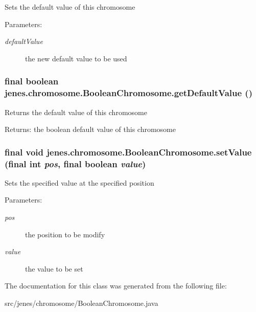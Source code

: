 Sets the default value of this chromosome 

\begin{Desc}
\item[Parameters:]
\begin{description}
\item[{\em defaultValue}]the new default value to be used \end{description}
\end{Desc}
\hypertarget{classjenes_1_1chromosome_1_1_boolean_chromosome_9b75f626b2b5fbc90215a53ac91d24a7}{
\subsubsection[getDefaultValue]{\setlength{\rightskip}{0pt plus 5cm}final boolean jenes.chromosome.BooleanChromosome.getDefaultValue ()}}
\label{classjenes_1_1chromosome_1_1_boolean_chromosome_9b75f626b2b5fbc90215a53ac91d24a7}


Returns the default value of this chromosome 

\begin{Desc}
\item[Returns:]the boolean default value of this chromosome \end{Desc}
\hypertarget{classjenes_1_1chromosome_1_1_boolean_chromosome_b37e05ed7a30e43b740f0c2d9c548e88}{
\subsubsection[setValue]{\setlength{\rightskip}{0pt plus 5cm}final void jenes.chromosome.BooleanChromosome.setValue (final int {\em pos}, \/  final boolean {\em value})}}
\label{classjenes_1_1chromosome_1_1_boolean_chromosome_b37e05ed7a30e43b740f0c2d9c548e88}


Sets the specified value at the specified position 

\begin{Desc}
\item[Parameters:]
\begin{description}
\item[{\em pos}]the position to be modify \item[{\em value}]the value to be set \end{description}
\end{Desc}


The documentation for this class was generated from the following file:\begin{CompactItemize}
\item 
src/jenes/chromosome/BooleanChromosome.java\end{CompactItemize}
